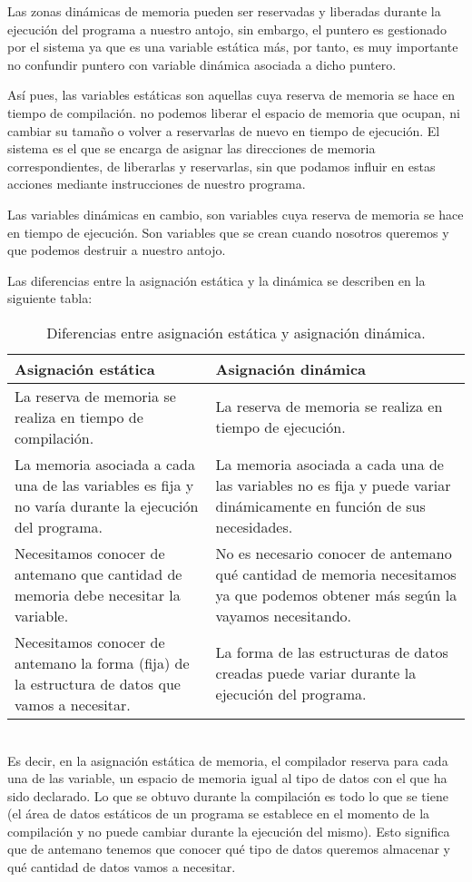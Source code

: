 Las zonas dinámicas de memoria pueden ser reservadas y liberadas durante la ejecución del programa a nuestro antojo, sin embargo, el puntero es gestionado por el sistema ya que es una variable estática más, por tanto, es muy importante no confundir puntero con variable dinámica asociada a dicho puntero.

Así pues, las variables estáticas son aquellas cuya reserva de memoria se hace en tiempo de compilación. no podemos liberar el espacio de memoria que ocupan, ni cambiar su tamaño o volver a reservarlas de nuevo en tiempo de ejecución. El sistema es el que se encarga de asignar las direcciones de memoria correspondientes, de liberarlas y reservarlas, sin que podamos influir en estas acciones mediante instrucciones de nuestro programa.

Las variables dinámicas en cambio, son variables cuya reserva de memoria se hace en tiempo de ejecución. Son variables que se crean cuando nosotros queremos y que podemos destruir a nuestro antojo.

Las diferencias entre la asignación estática y la dinámica se describen en la siguiente tabla:
\begin{table}[htbp]
	\begin{center}
		\begin{tabular}{|p{7,5cm} | p{}|}
			\hline 
			\textbf{Asignación estática} & \textbf{Asignación dinámica}  \\
			\hline
			La reserva de memoria se realiza en tiempo de compilación. & La reserva de memoria se realiza en tiempo de ejecución.\\ \hline
			La memoria asociada a cada una de las variables es fija y no varía durante la ejecución del programa. & La memoria asociada a cada una de las variables no es fija y puede variar dinámicamente en función de sus necesidades.\\ \hline
			Necesitamos conocer de antemano que cantidad de memoria debe necesitar la variable. & No es necesario conocer de antemano qué cantidad de memoria necesitamos ya que podemos obtener más según la vayamos necesitando.\\ \hline
			Necesitamos conocer de antemano la forma (fija) de la estructura de datos que vamos a necesitar. & La forma de las estructuras de datos creadas puede variar durante la ejecución del programa.\\ \hline
		\end{tabular}
		\caption{Diferencias entre asignación estática y asignación dinámica.}
		\label{tabla:Diferencias entre asignación estática y asignación dinámica}
	\end{center}
\end{table}
\\Es decir, en la asignación estática de memoria, el compilador reserva para cada una de las variable, un espacio de memoria igual al tipo de datos con el que ha sido declarado. Lo que se obtuvo durante la compilación es todo lo que se tiene (el área de datos estáticos de un programa se establece en el momento de la compilación y no puede cambiar durante la ejecución del mismo). Esto significa que de antemano tenemos que conocer qué tipo de datos queremos almacenar y qué cantidad de datos vamos a necesitar.

